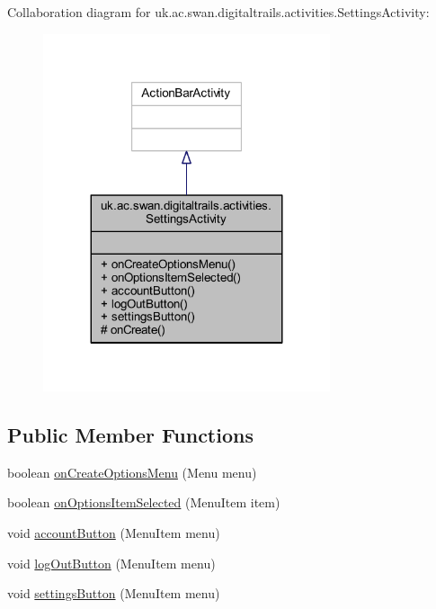 Collaboration diagram for uk.\+ac.\+swan.\+digitaltrails.\+activities.\+Settings\+Activity\+:
\nopagebreak
\begin{figure}[H]
\begin{center}
\leavevmode
\includegraphics[width=239pt]{classuk_1_1ac_1_1swan_1_1digitaltrails_1_1activities_1_1_settings_activity__coll__graph}
\end{center}
\end{figure}
\subsection*{Public Member Functions}
\begin{DoxyCompactItemize}
\item 
boolean \hyperlink{classuk_1_1ac_1_1swan_1_1digitaltrails_1_1activities_1_1_settings_activity_a6c32c6f4d1b544c20072de0b26dbd012}{on\+Create\+Options\+Menu} (Menu menu)
\item 
boolean \hyperlink{classuk_1_1ac_1_1swan_1_1digitaltrails_1_1activities_1_1_settings_activity_abf85a8e972a577387d200151e04478be}{on\+Options\+Item\+Selected} (Menu\+Item item)
\item 
void \hyperlink{classuk_1_1ac_1_1swan_1_1digitaltrails_1_1activities_1_1_settings_activity_ac2b1ab95450abe65a3d13103432cf123}{account\+Button} (Menu\+Item menu)
\item 
void \hyperlink{classuk_1_1ac_1_1swan_1_1digitaltrails_1_1activities_1_1_settings_activity_ac38ed518ecf1b7a272e5153de63e4782}{log\+Out\+Button} (Menu\+Item menu)
\item 
void \hyperlink{classuk_1_1ac_1_1swan_1_1digitaltrails_1_1activities_1_1_settings_activity_acffdd47e278d3277de1e9086c22dc66b}{settings\+Button} (Menu\+Item menu)
\end{DoxyCompactItemize}
